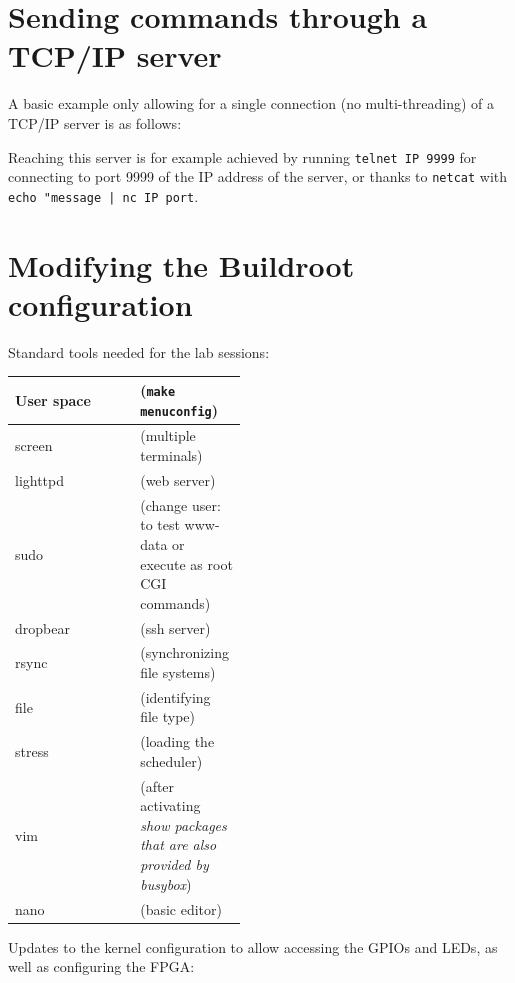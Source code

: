 \documentclass{article}
\begin{document}
{{\section{Sending commands through a TCP/IP server}\label{tcp}

A basic example only allowing for a single connection (no multi-threading) of a TCP/IP 
server is as follows:



Reaching this server is for example achieved by running {\tt telnet IP 9999} for
connecting to port 9999 of the IP address of the server, or thanks to 
{\tt netcat} with {\tt echo "message | nc IP port}.

\section{Modifying the Buildroot configuration}

Standard tools needed for the lab sessions:

\begin{tabular}{l|p{0.46\linewidth}}\hline
User space& ({\tt make menuconfig}) \\\hline\hline
screen & (multiple terminals)\\ 
lighttpd & (web server) \\
sudo & (change user: to test www-data or execute as root CGI commands)\\
dropbear & (ssh server)\\
rsync & (synchronizing file systems)\\
file & (identifying file type)\\
stress & (loading the scheduler)\\
vim & (after activating {\em show packages that are also provided by busybox}) \\
nano & (basic editor) \\ \hline
\end{tabular}

Updates to the kernel configuration to allow accessing the GPIOs and LEDs, as well as
configuring the FPGA:

}}
\end{document}
